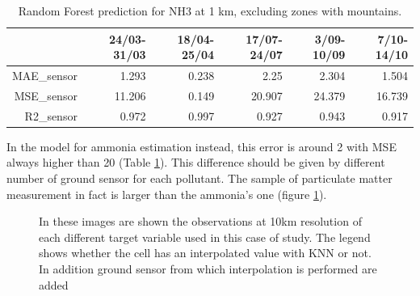\begin{table}[H]
\begin{tabular}{rrrrrr}
\hline
     &   24/03-31/03 &   18/04-25/04 &   17/07-24/07 &   3/09-10/09 &   7/10-14/10 \\
\hline
  MAE\_sensor   &            1.293 &            0.238 &            2.25  &            2.304 &            1.504 \\
  MSE\_sensor   &           11.206 &            0.149 &           20.907 &           24.379 &           16.739 \\
  R2\_sensor    &            0.972 &            0.997 &            0.927 &            0.943 &            0.917 \\
\hline
\end{tabular}
\caption{Random Forest prediction for NH3 at 1 km, excluding zones with mountains.}
\label{tab:nh3}
\end{table}
In the model for ammonia estimation instead, this error is around 2 with MSE always higher than 20 (Table \ref{tab:nh3}).
This difference should be given by different number of ground sensor for each pollutant. The sample of particulate matter measurement in fact is larger than the ammonia's one (figure \ref{fig:comparison-sensors}).
\begin{figure}[H] 
    \centering
    \hfill%
    \caption{In these images are shown the observations at 10km resolution of each different target variable used in this case of study. The legend shows whether the cell has an interpolated value with KNN or not. In addition ground sensor from which interpolation is performed are added}
    \label{fig:comparison-sensors}
\end{figure}

